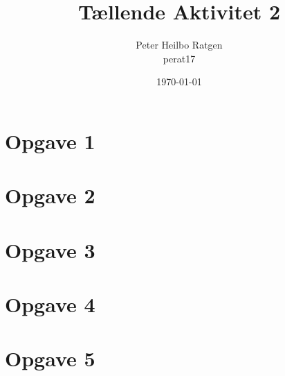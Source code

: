 \documentclass{article}
\title{Tællende Aktivitet 2}
\author{Peter Heilbo Ratgen \\ perat17}
\date{\today}
\begin{document}
\maketitle

\section*{Opgave 1}


\section*{Opgave 2}


\section*{Opgave 3}


\section*{Opgave 4}


\section*{Opgave 5}

\end{document}
